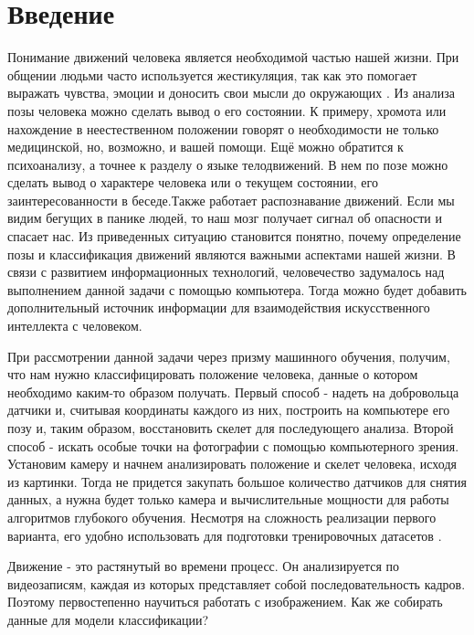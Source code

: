 \section{Введение}
\label{sec:Chapter0} 

Понимание движений человека является необходимой частью нашей жизни. При общении людьми часто используется жестикуляция, так как это помогает выражать чувства, эмоции и доносить свои мысли до окружающих . Из анализа позы человека можно сделать вывод о его состоянии. К примеру, хромота или нахождение в неестественном положении говорят о необходимости не только медицинской, но, возможно, и вашей помощи. Ещё можно обратится к психоанализу, а точнее к разделу о языке телодвижений. В нем по позе можно сделать вывод о характере человека или о текущем состоянии, его заинтересованности  в беседе.Также работает распознавание движений. Если мы видим бегущих в панике людей, то наш мозг получает сигнал об опасности и спасает нас. Из приведенных ситуацию   становится  понятно, почему определение позы и классификация движений являются важными аспектами нашей жизни. В связи с развитием информационных технологий, человечество задумалось над выполнением данной задачи с помощью компьютера. Тогда можно будет добавить дополнительный источник информации для  взаимодействия искусственного интеллекта с человеком.

При рассмотрении данной задачи через призму машинного обучения, получим, что нам нужно классифицировать положение человека, данные о котором необходимо каким-то образом получать. Первый способ - надеть на добровольца датчики и, считывая координаты каждого из них, построить на компьютере его позу и, таким образом, восстановить скелет для последующего анализа. Второй способ - искать особые точки на фотографии с помощью компьютерного зрения. Установим камеру и начнем анализировать положение и скелет человека, исходя из картинки. Тогда не придется закупать большое количество датчиков для снятия данных, а нужна будет только камера и вычислительные мощности для работы алгоритмов глубокого обучения. Несмотря на сложность реализации первого варианта, его удобно использовать для подготовки тренировочных датасетов \cite{h36m_pami}.

\hfill \break
Движение - это растянутый во времени процесс. Он анализируется по видеозаписям, каждая из которых представляет собой последовательность кадров. Поэтому первостепенно научиться работать с изображением. Как же собирать данные для модели классификации?

